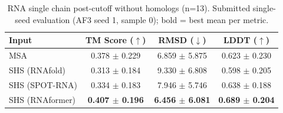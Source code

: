 \begin{table}[htbp]
\centering
\caption{RNA single chain post-cutoff without homologs (n=13). Submitted single-seed evaluation (AF3 seed 1, sample 0); bold = best mean per metric.}
\label{tab:rna_single_chain_post_cutoff_without_homologs}
\begin{tabular}{lccc}
\toprule
Input & TM Score ($\uparrow$) & RMSD ($\downarrow$) & LDDT ($\uparrow$) \\
\midrule
MSA & 0.378 $\pm$ 0.229 & 6.859 $\pm$ 5.875 & 0.623 $\pm$ 0.230 \\
SHS (RNAfold) & 0.313 $\pm$ 0.184 & 9.330 $\pm$ 6.808 & 0.598 $\pm$ 0.205 \\
SHS (SPOT-RNA) & 0.334 $\pm$ 0.183 & 7.946 $\pm$ 5.746 & 0.638 $\pm$ 0.188 \\
SHS (RNAformer) & \textbf{0.407 $\pm$ 0.196} & \textbf{6.456 $\pm$ 6.081} & \textbf{0.689 $\pm$ 0.204} \\
\bottomrule
\end{tabular}
\end{table}
